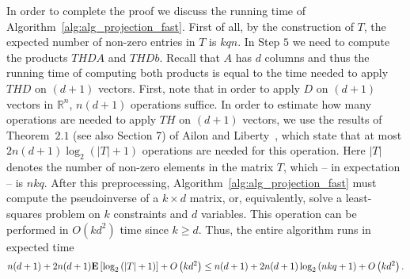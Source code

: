 \documentclass[11pt]{article}
\newcommand{\Expect}[1]{\mbox{}{\bf{E}}\left[#1\right]}
\newcommand{\abs }[1]{\left|#1\right|}
\begin{document}
In order to complete the proof we discuss the running time of Algorithm~\ref{alg:alg_projection_fast}. First of all, by the construction of $T$, the expected number of non-zero entries in $T$ is $kqn$. In Step $5$ we need to compute the products $THDA$ and $THDb$. Recall that $A$ has $d$ columns and thus the running time of computing both products is equal to the time needed to apply $THD$ on $(d+1)$ vectors. First, note that in order to apply $D$ on $(d+1)$ vectors in $\mathbb{R}^n$, $n(d+1)$ operations suffice. In order to estimate how many operations are needed to apply $TH$ on $(d+1)$ vectors, we use the results of Theorem~$2.1$ (see also Section 7) of Ailon and Liberty~\cite{AL08}, which state that at most $2n(d+1)\log_2 \left(\abs{T}+1\right)$ operations are needed for this operation. Here $\abs{T}$ denotes the number of non-zero elements in the matrix $T$, which -- in expectation -- is $nkq$. After this preprocessing, Algorithm~\ref{alg:alg_projection_fast} must compute the pseudoinverse of a $k \times d$ matrix, or, equivalently, solve a least-squares problem on $k$ constraints and $d$ variables. This operation can be performed in $O(kd^2)$ time since $k \geq d$. Thus, the entire algorithm runs in expected time
$$n(d+1) + 2n(d+1) \Expect{\log_2 \left(\abs{T} + 1\right)} + O\left(kd^2 \right) \leq n(d+1) + 2n(d+1) \log_2 \left(nkq + 1\right) + O\left(kd^2 \right).$$
\end{document}
